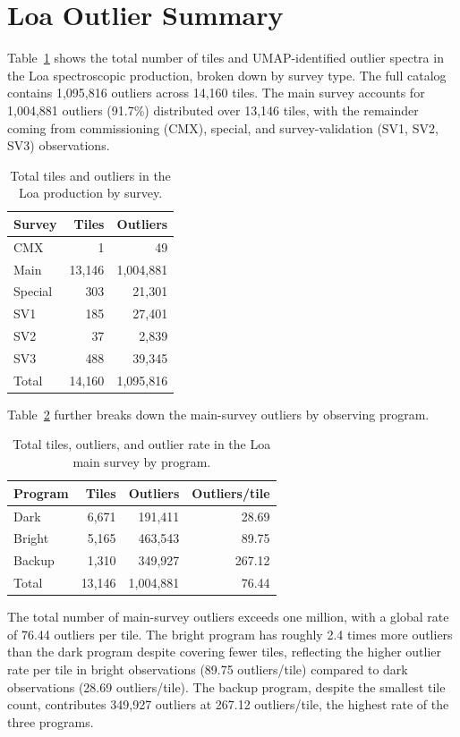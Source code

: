 \section{Loa Outlier Summary}

Table~\ref{tab:loa_survey} shows the total number of tiles and
UMAP-identified outlier spectra in the Loa spectroscopic production,
broken down by survey type.
The full catalog contains 1{,}095{,}816 outliers across 14{,}160 tiles.
The main survey accounts for 1{,}004{,}881 outliers (91.7\%) distributed
over 13{,}146 tiles, with the remainder coming from commissioning (CMX),
special, and survey-validation (SV1, SV2, SV3) observations.

\begin{table}[h]
\centering
\caption{Total tiles and outliers in the Loa production by survey.}
\label{tab:loa_survey}
\begin{tabular}{lrr}
\hline
Survey  & Tiles  & Outliers \\
\hline
CMX     &      1 &         49 \\
Main    & 13{,}146 & 1{,}004{,}881 \\
Special &    303 &     21{,}301 \\
SV1     &    185 &     27{,}401 \\
SV2     &     37 &      2{,}839 \\
SV3     &    488 &     39{,}345 \\
\hline
Total   & 14{,}160 & 1{,}095{,}816 \\
\hline
\end{tabular}
\end{table}

Table~\ref{tab:loa_summary} further breaks down the main-survey outliers
by observing program.

\begin{table}[h]
\centering
\caption{Total tiles, outliers, and outlier rate in the Loa main survey by program.}
\label{tab:loa_summary}
\begin{tabular}{lrrr}
\hline
Program & Tiles & Outliers & Outliers/tile \\
\hline
Dark   & 6{,}671  & 191{,}411 &  28.69 \\
Bright & 5{,}165  & 463{,}543 &  89.75 \\
Backup & 1{,}310  & 349{,}927 & 267.12 \\
\hline
Total  & 13{,}146 & 1{,}004{,}881 & 76.44 \\
\hline
\end{tabular}
\end{table}

The total number of main-survey outliers exceeds one million,
with a global rate of 76.44 outliers per tile.
The bright program has roughly 2.4 times more outliers than the dark program
despite covering fewer tiles, reflecting the higher outlier rate
per tile in bright observations (89.75 outliers/tile)
compared to dark observations (28.69 outliers/tile).
The backup program, despite the smallest tile count, contributes
349{,}927 outliers at 267.12 outliers/tile, the highest rate of the three programs.
